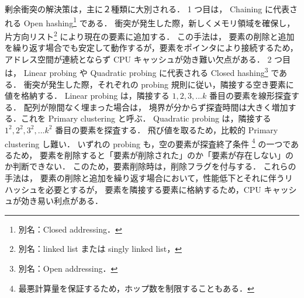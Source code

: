 剰余衝突の解決策は，主に２種類に大別される．
1 つ目は，
Chaining に代表される Open hashing\footnote{別名：Closed addressing．} である．
衝突が発生した際，新しくメモリ領域を確保し，片方向リスト\footnote{別名：linked list または singly linked list，} により現在の要素に追加する．
この手法は，
要素の削除と追加を繰り返す場合でも安定して動作するが，要素をポインタにより接続するため，
アドレス空間が連続とならず CPU キャッシュが効き難い欠点がある．
2 つ目は，
Linear probing や Quadratic probing に代表される Closed hashing\footnote{別名：Open addressing．} である．
衝突が発生した際，それぞれの probing 規則に従い，隣接する空き要素に値を格納する．
Linear probing は，隣接する $1, 2, 3, ... k$ 番目の要素を線形探査する．
配列が隙間なく埋まった場合は，
境界が分からず探査時間は大きく増加する．これを Primary clustering と呼ぶ．
Quadratic probing は，隣接する $1^2, 2^2, 3^2, ... k^2$ 番目の要素を探査する．
飛び値を取るため，比較的 Primary clustering し難い．
いずれの probing も，空の要素が探査終了条件 \footnote{最悪計算量を保証するため，ホップ数を制限することもある．} の一つであるため，
要素を削除すると「要素が削除された」のか「要素が存在しない」のか判断できない．
このため，要素削除時は，削除フラグを付与する．
これらの手法は，
要素の削除と追加を繰り返す場合において，性能低下とそれに伴うリハッシュを必要とするが，
要素を隣接する要素に格納するため，CPU キャッシュが効き易い利点がある．


